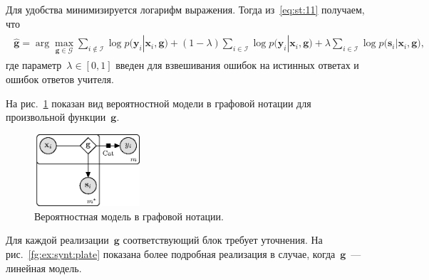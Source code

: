 Для удобства минимизируется логарифм выражения. Тогда из~\eqref{eq:st:11} получаем, что
\begin{gather}
\label{eq:st:12}
\begin{aligned}
\hat{\mathbf{g}} = \arg\max_{\mathbf{g}\in \mathcal{G}} \sum_{i\not\in \mathcal{I}}\log p\bigr(\mathbf{y}_i|\mathbf{x}_i, \mathbf{g}\bigr) + \left(1-\lambda\right)\sum_{i\in \mathcal{I}}\log p\bigr(\mathbf{y}_i|\mathbf{x}_i, \mathbf{g}\bigr) + \lambda\sum_{i\in \mathcal{I}}\log p\bigr(\mathbf{s}_i|\mathbf{x}_i, \mathbf{g}\bigr),
\end{aligned}
\end{gather}
где параметр~$\lambda \in [0,1]$ введен для взвешивания ошибок на истинных ответах и ошибок ответов учителя.

На рис.~\ref{fg:st:plate} показан вид вероятностной модели в графовой нотации для произвольной функции~$\mathbf{g}$.

\begin{figure}[!ht]\center
\includegraphics[width=0.35\textwidth]{results/privlearn/general_model}
\caption{Вероятностная модель в графовой нотации.}
\label{fg:st:plate}
\end{figure}

Для каждой реализации~$\mathbf{g}$ соответствующий блок требует уточнения. На рис.~\ref{fg:ex:synt:plate} показана более подробная реализация в случае, когда~$\mathbf{g}$~--- линейная модель.

